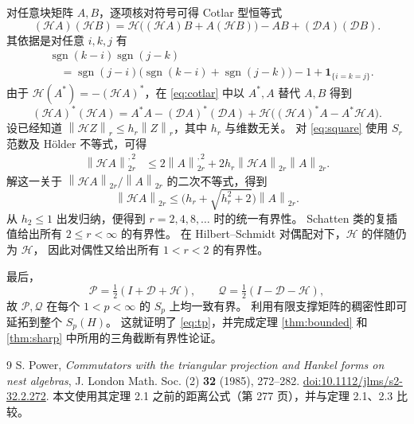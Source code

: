 \documentclass[UTF8,11pt,a4paper,fontset=fandol]{ctexart}
\theoremstyle{remark}
\newcommand{\PP}{\mathcal P}
\newcommand{\QQ}{\mathcal Q}
\newcommand{\DD}{\mathcal D}
\newcommand{\HH}{\mathcal H}
\newcommand{\norm}[1]{\left\lVert #1\right\rVert}
\begin{document}
\medskip
对任意块矩阵 $A,B$，逐项核对符号可得 Cotlar 型恒等式
\begin{equation}\label{eq:cotlar}
 (\HH A)(\HH B)
 =\HH\bigl((\HH A)B+A(\HH B)\bigr)-AB+(\DD A)(\DD B).
\end{equation}
其依据是对任意 $i,k,j$ 有
\begin{align*}
 &\operatorname{sgn}(k-i)\operatorname{sgn}(j-k)\\
 &\quad=\operatorname{sgn}(j-i)
   \bigl(\operatorname{sgn}(k-i)+\operatorname{sgn}(j-k)\bigr)
    -1+\mathbf1_{\{i=k=j\}}.
\end{align*}
由于 $\HH(A^*)=-(\HH A)^*$，在 \eqref{eq:cotlar} 中以 $A^*,A$
替代 $A,B$ 得到
\begin{equation}\label{eq:square}
 (\HH A)^*(\HH A)
 =A^*A-(\DD A)^*(\DD A)
   +\HH\bigl((\HH A)^*A-A^*\HH A\bigr).
\end{equation}
设已经知道 $\norm{\HH Z}_r\leq h_r\norm Z_r$，其中 $h_r$ 与维数无关。
对 \eqref{eq:square} 使用 $S_r$ 范数及 H\"older 不等式，可得
\begin{align*}
 \norm{\HH A}_{2r}^{,2}
 &\leq 2\norm A_{2r}^{,2}
       +2h_r\norm{\HH A}_{2r}\norm A_{2r}.
\end{align*}
解这一关于 $\norm{\HH A}_{2r}/\norm A_{2r}$ 的二次不等式，得到
\[
 \norm{\HH A}_{2r}\leq
 \bigl(h_r+\sqrt{h_r^2+2}\bigr)\norm A_{2r}.
\]
从 $h_2\leq1$ 出发归纳，便得到 $r=2,4,8,\ldots$ 时的统一有界性。
Schatten 类的复插值给出所有 $2\leq r<\infty$ 的有界性。
在 Hilbert--Schmidt 对偶配对下，$\HH$ 的伴随仍为 $\HH$，
因此对偶性又给出所有 $1<r<2$ 的有界性。

最后，
\[
 \PP=\tfrac12(I+\DD+\HH),\qquad
 \QQ=\tfrac12(I-\DD-\HH),
\]
故 $\PP,\QQ$ 在每个 $1<p<\infty$ 的 $S_p$ 上均一致有界。
利用有限支撑矩阵的稠密性即可延拓到整个 $S_p(H)$。
这就证明了 \eqref{eq:tp}，并完成定理 \ref{thm:bounded} 和
\ref{thm:sharp} 中所用的三角截断有界性论证。

\begin{thebibliography}{9}
S. Power,
\emph{Commutators with the triangular projection and Hankel forms on nest algebras},
J. London Math. Soc. (2) \textbf{32} (1985), 272--282.
\href{https://doi.org/10.1112/jlms/s2-32.2.272}{doi:10.1112/jlms/s2-32.2.272}.
本文使用其定理 2.1 之前的距离公式（第 277 页），并与定理 2.1、2.3 比较。
\end{thebibliography}
\end{document}
